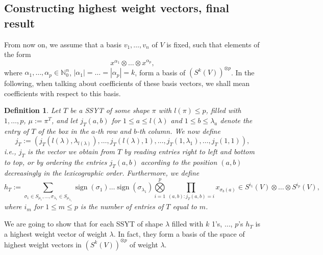 \documentclass[a4paper]{amsart}
\newtheorem{definition}{Definition}
\def\N{{\mathbb{N}}}
\DeclareMathOperator{\sign}{\mathrm{sign}}
\newcommand{\abs}[1]{\left| #1\right|}
\begin{document}
\subsection{Constructing highest weight vectors, final result}
From now on, we assume that a basis $v_1,\ldots,v_n$ of $V$ is fixed, such that elements of the form
\begin{displaymath}
	x^{\alpha_1}\otimes\ldots\otimes x^{\alpha_p},
\end{displaymath}
where $\alpha_1,\ldots,\alpha_p\in\N_0^n$, $\abs{\alpha_1}=\ldots=\abs{\alpha_p}=k$, form a basis of $(S^k(V))^{\otimes p}$.
In the following, when talking about coefficients of these basis vectors, we shall mean coefficients with respect to this basis.
\begin{definition}
	Let $T$ be a SSYT of some shape $\pi$ with $l(\pi)\leq p$, filled with $1,\ldots,p$, $\mu:=\pi^T$,
	and let $j_T(a,b)$ for $1\leq a\leq l(\lambda)$ and $1\leq b\leq \lambda_a$ denote the entry of $T$ of the box in the $a$-th row and $b$-th column.
	We now define
	\begin{displaymath}
		j_T:=(j_T(l(\lambda),\lambda_{l(\lambda)}),\ldots,j_T(l(\lambda),1),\ldots,j_T(1,\lambda_1),\ldots,j_T(1,1)),
	\end{displaymath}
	i.e., $j_T$ is the vector we obtain from $T$ by reading entries right to left and bottom to top,
	or by ordering the entries $j_T(a,b)$ according to the position $(a,b)$ decreasingly in the lexicographic order.
	Furthermore,
	we define
	\begin{displaymath}
		h_T:=
		\sum\limits_{\sigma_1\in S_{\mu_1},\ldots,\sigma_{\lambda_1}\in S_{\mu_{\lambda_1}}}\sign(\sigma_1)\ldots\sign(\sigma_{\lambda_1})
		\bigotimes\limits_{i=1}^p\prod\limits_{(a,b):j_T(a,b)=i}x_{\sigma_b(a)}\in S^{i_1}(V)\otimes\ldots\otimes S^{i_p}(V),
	\end{displaymath}
	where $i_m$ for $1\leq m\leq p$ is the number of entries of $T$ equal to $m$.
\end{definition}
	We are going to show that for each SSYT of shape $\lambda$ filled with $k$ 1's, $\ldots$, $p$'s $h_T$ is a highest weight vector of weight $\lambda$.
	In fact, they form a basis of the space of highest weight vectors in $(S^k(V))^{\otimes p}$ of weight $\lambda$.
\end{document}
